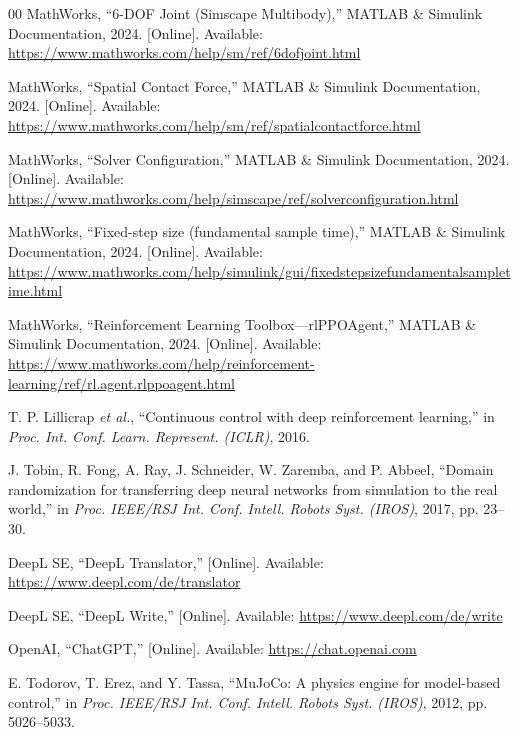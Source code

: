 \documentclass{ieeeaccess}
\begin{document}
\begin{thebibliography}{00}
MathWorks, ``6-DOF Joint (Simscape Multibody),'' MATLAB \& Simulink Documentation, 2024. [Online]. Available: \url{https://www.mathworks.com/help/sm/ref/6dofjoint.html}



MathWorks, ``Spatial Contact Force,'' MATLAB \& Simulink Documentation, 2024. [Online]. Available: \url{https://www.mathworks.com/help/sm/ref/spatialcontactforce.html}



MathWorks, ``Solver Configuration,'' MATLAB \& Simulink Documentation, 2024. [Online]. Available: \url{https://www.mathworks.com/help/simscape/ref/solverconfiguration.html}



MathWorks, ``Fixed-step size (fundamental sample time),'' MATLAB \& Simulink Documentation, 2024. [Online]. Available: \url{https://www.mathworks.com/help/simulink/gui/fixedstepsizefundamentalsampletime.html}



MathWorks, ``Reinforcement Learning Toolbox---rlPPOAgent,'' MATLAB \& Simulink Documentation, 2024. [Online]. Available: \url{https://www.mathworks.com/help/reinforcement-learning/ref/rl.agent.rlppoagent.html}



T. P. Lillicrap \emph{et al.}, ``Continuous control with deep reinforcement learning,'' in \emph{Proc. Int. Conf. Learn. Represent. (ICLR)}, 2016.



J. Tobin, R. Fong, A. Ray, J. Schneider, W. Zaremba, and P. Abbeel, ``Domain randomization for transferring deep neural networks from simulation to the real world,'' in \emph{Proc. IEEE/RSJ Int. Conf. Intell. Robots Syst. (IROS)}, 2017, pp. 23--30.


DeepL SE, ``DeepL Translator,'' [Online]. Available: \url{https://www.deepl.com/de/translator}

DeepL SE, ``DeepL Write,'' [Online]. Available: \url{https://www.deepl.com/de/write}


OpenAI, ``ChatGPT,'' [Online]. Available: \url{https://chat.openai.com}



E. Todorov, T. Erez, and Y. Tassa, ``MuJoCo: A physics engine for model-based control,'' in \emph{Proc. IEEE/RSJ Int. Conf. Intell. Robots Syst. (IROS)}, 2012, pp. 5026--5033.




\end{thebibliography}
\end{document}
